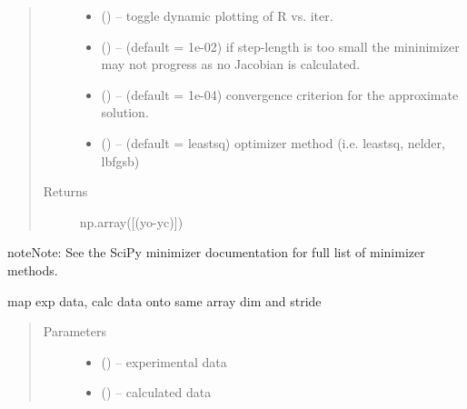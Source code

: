 \documentclass[letterpaper,10pt,english]{sphinxmanual}
\begin{document}
\begin{fulllineitems}
\begin{fulllineitems}
\begin{quote}
\begin{description}
\begin{itemize}
\item {} 
 () -- toggle dynamic plotting of R vs. iter.

\item {} 
 () -- (default = 1e-02) if step-length is too small the
mininimizer may not progress as no Jacobian is calculated.

\item {} 
 () -- (default = 1e-04) convergence criterion for the approximate solution.

\item {} 
 () -- (default = leastsq) optimizer method (i.e. leastsq, nelder, lbfgsb)

\end{itemize}

\item[{Returns}] \leavevmode
np.array({[}(yo-yc){]})

\end{description}\end{quote}

\begin{sphinxadmonition}{note}{Note:}
See the SciPy minimizer documentation for full list of minimizer methods.
\end{sphinxadmonition}

\end{fulllineitems}


\begin{fulllineitems}
\label{\detokenize{rst/pairdistributionfunction:mstack.pairdistributionfunction.PdfRefinement.map_exp_calc}}
map exp data, calc data onto same array dim and stride
\begin{quote}\begin{description}
\item[{Parameters}] \leavevmode\begin{itemize}
\item {} 
 () -- experimental data

\item {} 
 () -- calculated data


\end{itemize}
\end{description}
\end{quote}
\end{fulllineitems}
\end{fulllineitems}
\end{document}

